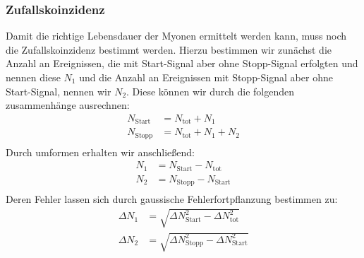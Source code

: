 \documentclass{article}
\begin{document}
\subsubsection*{Zufallskoinzidenz}
Damit die richtige Lebensdauer der Myonen ermittelt werden kann, muss noch die Zufallskoinzidenz bestimmt werden.
Hierzu bestimmen wir zunächst die Anzahl an Ereignissen, die mit Start-Signal aber ohne Stopp-Signal erfolgten und nennen diese $N_1$ und 
die Anzahl an Ereignissen mit Stopp-Signal aber ohne Start-Signal, nennen wir $N_2$.
Diese können wir durch die folgenden zusammenhänge ausrechnen:
\begin{align*}
    N_\text{Start}&=N_\text{tot}+N_1 \\
    N_\text{Stopp}&=N_\text{tot}+N_1+N_2 \\
\end{align*}
Durch umformen erhalten wir anschließend:
\begin{align*}
    N_1&=N_\text{Start}-N_\text{tot} \\
    N_2&=N_\text{Stopp}-N_\text{Start} \\
\end{align*}
Deren Fehler lassen sich durch gaussische Fehlerfortpflanzung bestimmen zu:
\begin{align*}
    \Delta N_1&=\sqrt{\Delta N^2_\text{Start}-\Delta N^2_\text{tot}} \\
    \Delta N_2&=\sqrt{\Delta N^2_\text{Stopp}-\Delta N^2_\text{Start}} \\
\end{align*}
\end{document}
